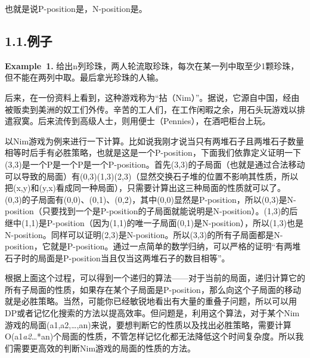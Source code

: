 \documentclass{article}
\begin{document}
\noindent{}也就是说P-position是，N-position是。%

\subsection{1.1.\hspace*{0.5em}例子}\label{section}%

\begin{mdbmarginx}{1ex}{0pt}{1ex}{0pt}%
\noindent{}\textbf{Example~1.} \mdbr
{}给出n列珍珠，两人轮流取珍珠，每次在某一列中取至少1颗珍珠，但不能在两列中取。最后拿光珍珠的人输。%
\end{mdbmarginx}%

\noindent{}后来，在一份资料上看到，这种游戏称为“拈（Nim）”。据说，它源自中国，经由被贩卖到美洲的奴工们外传。辛苦的工人们，在工作闲暇之余，用石头玩游戏以排遣寂寞。后来流传到高级人士，则用便士（Pennies），在酒吧柜台上玩。%

以Nim游戏为例来进行一下计算。比如说我刚才说当只有两堆石子且两堆石子数量相等时后手有必胜策略，也就是这是一个P-position，下面我们依靠定义证明一下(3,3)是一个P是一个P是一个P-position。首先(3,3)的子局面（也就是通过合法移动可以导致的局面）有(0,3)(1,3)(2,3)（显然交换石子堆的位置不影响其性质，所以把(x,y)和(y,x)看成同一种局面），只需要计算出这三种局面的性质就可以了。 (0,3)的子局面有(0,0)、(0,1)、(0,2)，其中(0,0)显然是P-position，所以(0,3)是N-position（只要找到一个是P-position的子局面就能说明是N-position）。(1,3)的后继中(1,1)是P-position（因为(1,1)的唯一子局面(0,1)是N-position），所以(1,3)也是N-position。同样可以证明(2,3)是N-position。所以(3,3)的所有子局面都是N-position，它就是P-position。通过一点简单的数学归纳，可以严格的证明“有两堆石子时的局面是P-position当且仅当这两堆石子的数目相等”。%

根据上面这个过程，可以得到一个递归的算法——对于当前的局面，递归计算它的所有子局面的性质，如果存在某个子局面是P-position，那么向这个子局面的移动就是必胜策略。当然，可能你已经敏锐地看出有大量的重叠子问题，所以可以用DP或者记忆化搜索的方法以提高效率。但问题是，利用这个算法，对于某个Nim游戏的局面(a1,a2,\dots{},an)来说，要想判断它的性质以及找出必胜策略，需要计算O(a1\emph{a2}\dots{}*an)个局面的性质，不管怎样记忆化都无法降低这个时间复杂度。所以我们需要更高效的判断Nim游戏的局面的性质的方法。%
\end{document}
